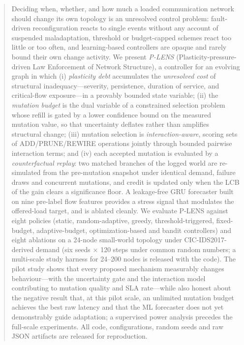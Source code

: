 \documentclass[runningheads]{llncs}
\begin{document}
\begin{abstract}
Deciding when, whether, and how much a loaded communication network should
change its own topology is an unresolved control problem: fault-driven
reconfiguration reacts to single events without any account of suspended
maladaptation, threshold or budget-capped schemes react too little or too
often, and learning-based controllers are opaque and rarely bound their own
change activity. We present \emph{P-LENS} (Plasticity-pressure-driven Law
Enforcement of Network Structure), a controller for an evolving graph in
which (i) \emph{plasticity debt} accumulates the \emph{unresolved cost} of
structural inadequacy—severity, persistence, duration of service, and
critical-flow exposure—in a provably bounded state variable; (ii) the
\emph{mutation budget} is the dual variable of a constrained
selection problem whose refill is gated by a lower confidence bound on the
measured mutation value, so that uncertainty deflates rather than amplifies
structural change; (iii) mutation selection is \emph{interaction-aware},
scoring sets of ADD/PRUNE/REWIRE operations jointly through bounded pairwise
interaction terms; and (iv) each accepted mutation is evaluated by a
\emph{counterfactual replay}: two matched branches of the logged world are
re-simulated from the pre-mutation snapshot under identical demand, failure
draws and concurrent mutations, and credit is updated only when the LCB of
the gain clears a significance floor. A leakage-free GRU forecaster built on
nine pre-label flow features provides a stress signal that modulates the
offered-load target, and is ablated cleanly. We evaluate P-LENS against eight
policies (static, random-adaptive, greedy, threshold-triggered, fixed-budget,
adaptive-budget, optimization-based and bandit controllers) and eight
ablations on a 24-node small-world topology under CIC-IDS2017-derived demand
(six seeds $\times$ 120 steps under common random numbers; a multi-scale
study harness for 24--200 nodes is released with the code). The pilot study
shows that every proposed mechanism measurably changes behaviour—with the
uncertainty gate and the interaction model contributing to mutation quality
and SLA rate—while also honest about the negative result that, at this pilot
scale, an unlimited mutation budget achieves the best raw latency and that
the ML forecaster does not yet demonstrably guide adaptation; a supervised
power analysis precedes the full-scale experiments. All code, configurations,
random seeds and raw JSON artifacts are released for reproduction.
\end{abstract}
\end{document}
